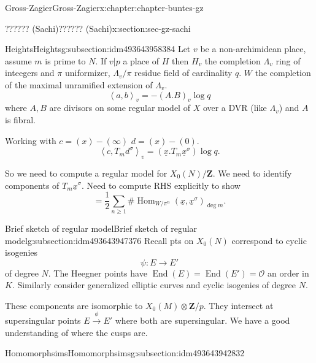 \documentclass[oneside,10pt,]{book}
\numberwithin{equation}{section}
\newcommand{\pair}[2]{\left\langle #1, #2 \right\rangle}
\newcommand{\ZZ}{\mathbf{Z}}
\newcommand{\ints}{\mathcal{O}}
\DeclareMathOperator{\End}{End}
\DeclareMathOperator{\Hom}{Hom}
\begin{document}
\begin{chapterptx}{Gross-Zagier}{}{Gross-Zagier}{}{}{x:chapter:chapter-buntes-gz}
\begin{sectionptx}{?????? (Sachi)}{}{?????? (Sachi)}{}{}{x:section:sec-gz-sachi}
\begin{subsectionptx}{Heights}{}{Heights}{}{}{g:subsection:idm493643958384}
Let \(v\) be a non-archimidean place, assume \(m\) is prime to \(N\). If \(v|p\) a place of \(H\) then \(H_v\) the completion \(\Lambda _v\) ring of inteegers and \(\pi \) uniformizer, \(\Lambda _v/\pi \) residue  field of cardinality \(q\). \(W\) the completion of the maximal unramified extension of \(\Lambda _v\).%
\begin{equation*}
\pair ab_v = -(A.B) _v \log q
\end{equation*}
where \(A,B\) are divisors on some regular model of \(X\) over  a DVR (like \(\Lambda _v\)) and \(A\) is fibral.%
\par
Working with \(c = (x)-(\infty )\) \(d = (x)-(0)\).%
\begin{equation*}
\pair c{T_m d^\sigma }_v = (\underline x. T_m \underline x^\sigma )\log q\text{.}
\end{equation*}
%
\par
So we need to compute a regular model for \(X_0(N)/\ZZ\). We need to identify components of \(T_m \underline x^\sigma \). Need to compute RHS explicitly to show%
\begin{equation*}
= \frac 12 \sum_{n\ge 1} \#\Hom _{W/\pi ^n} (\underline x ,\underline x^\sigma )_{\deg m}\text{.}
\end{equation*}
%
\end{subsectionptx}
%
%
\typeout{************************************************}
\typeout{************************************************}
%
\begin{subsectionptx}{Brief sketch of regular model}{}{Brief sketch of regular model}{}{}{g:subsection:idm493643947376}
Recall pts on \(X_0(N)\) correspond to cyclic isogenies%
\begin{equation*}
\psi \colon E \to  E'
\end{equation*}
of degree \(N\). The Heegner points have \(\End(E) = \End(E') = \ints\) an order in \(K\). Similarly consider generalized elliptic curves and cyclic isogenies of degree \(N\).%
\par
These components are isomorphic to \(X_0(M) \otimes \ZZ/p\). They intersect at supersingular points \(E\xrightarrow \phi E'\) where both are supersingular. We have  a good understanding of where the cusps are.%
\end{subsectionptx}
%
%
\typeout{************************************************}
\typeout{************************************************}
%
\begin{subsectionptx}{Homomorphsims}{}{Homomorphsims}{}{}{g:subsection:idm493643942832}

\end{subsectionptx}
\end{sectionptx}
\end{chapterptx}
\end{document}
